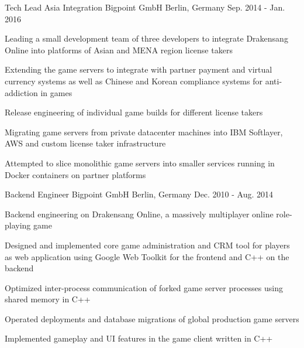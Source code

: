\begin{cventries}
  \cventry
    {Tech Lead Asia Integration} %
    {Bigpoint GmbH} %
    {Berlin, Germany} %
    {Sep. 2014 - Jan. 2016} %
    {
      \begin{cvitems} %
        \item {Leading a small development team of three developers to integrate Drakensang Online into platforms of Asian and MENA region license takers}
        \begin{cvsubitems}
          \item {Extending the game servers to integrate with partner payment and virtual currency systems as well as Chinese and Korean compliance systems for anti-addiction in games}
          \item {Release engineering of individual game builds for different license takers}
          \item {Migrating game servers from private datacenter machines into IBM Softlayer, AWS and custom license taker infrastructure}
          \item {Attempted to slice monolithic game servers into smaller services running in Docker containers on partner platforms}
        \end{cvsubitems}
      \end{cvitems}
    }

  \cventry
    {Backend Engineer} %
    {Bigpoint GmbH} %
    {Berlin, Germany} %
    {Dec. 2010 - Aug. 2014} %
    {
      \begin{cvitems} %
        \item {Backend engineering on Drakensang Online, a massively multiplayer online role-playing game}
        \begin{cvsubitems}
          \item {Designed and implemented core game administration and CRM tool for players as web application using Google Web Toolkit for the frontend and C++ on the backend}
          \item {Optimized inter-process communication of forked game server processes using shared memory in C++}
          \item {Operated deployments and database migrations of global production game servers}
          \item {Implemented gameplay and UI features in the game client written in C++}
        \end{cvsubitems}
      \end{cvitems}
    }


\end{cventries}
